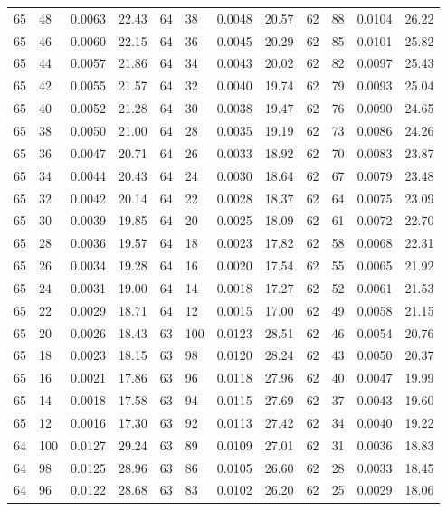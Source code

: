 \begin{tabular}{llll|llll|llll}
65 & 48 & 0.0063 & 22.43 & 64 & 38 & 0.0048 & 20.57 & 62 & 88 & 0.0104 & 26.22\\
65 & 46 & 0.0060 & 22.15 & 64 & 36 & 0.0045 & 20.29 & 62 & 85 & 0.0101 & 25.82\\
65 & 44 & 0.0057 & 21.86 & 64 & 34 & 0.0043 & 20.02 & 62 & 82 & 0.0097 & 25.43\\
65 & 42 & 0.0055 & 21.57 & 64 & 32 & 0.0040 & 19.74 & 62 & 79 & 0.0093 & 25.04\\
65 & 40 & 0.0052 & 21.28 & 64 & 30 & 0.0038 & 19.47 & 62 & 76 & 0.0090 & 24.65\\
65 & 38 & 0.0050 & 21.00 & 64 & 28 & 0.0035 & 19.19 & 62 & 73 & 0.0086 & 24.26\\
65 & 36 & 0.0047 & 20.71 & 64 & 26 & 0.0033 & 18.92 & 62 & 70 & 0.0083 & 23.87\\
65 & 34 & 0.0044 & 20.43 & 64 & 24 & 0.0030 & 18.64 & 62 & 67 & 0.0079 & 23.48\\
65 & 32 & 0.0042 & 20.14 & 64 & 22 & 0.0028 & 18.37 & 62 & 64 & 0.0075 & 23.09\\
65 & 30 & 0.0039 & 19.85 & 64 & 20 & 0.0025 & 18.09 & 62 & 61 & 0.0072 & 22.70\\
65 & 28 & 0.0036 & 19.57 & 64 & 18 & 0.0023 & 17.82 & 62 & 58 & 0.0068 & 22.31\\
65 & 26 & 0.0034 & 19.28 & 64 & 16 & 0.0020 & 17.54 & 62 & 55 & 0.0065 & 21.92\\
65 & 24 & 0.0031 & 19.00 & 64 & 14 & 0.0018 & 17.27 & 62 & 52 & 0.0061 & 21.53\\
65 & 22 & 0.0029 & 18.71 & 64 & 12 & 0.0015 & 17.00 & 62 & 49 & 0.0058 & 21.15\\
65 & 20 & 0.0026 & 18.43 & 63 & 100 & 0.0123 & 28.51 & 62 & 46 & 0.0054 & 20.76\\
65 & 18 & 0.0023 & 18.15 & 63 & 98 & 0.0120 & 28.24 & 62 & 43 & 0.0050 & 20.37\\
65 & 16 & 0.0021 & 17.86 & 63 & 96 & 0.0118 & 27.96 & 62 & 40 & 0.0047 & 19.99\\
65 & 14 & 0.0018 & 17.58 & 63 & 94 & 0.0115 & 27.69 & 62 & 37 & 0.0043 & 19.60\\
65 & 12 & 0.0016 & 17.30 & 63 & 92 & 0.0113 & 27.42 & 62 & 34 & 0.0040 & 19.22\\
64 & 100 & 0.0127 & 29.24 & 63 & 89 & 0.0109 & 27.01 & 62 & 31 & 0.0036 & 18.83\\
64 & 98 & 0.0125 & 28.96 & 63 & 86 & 0.0105 & 26.60 & 62 & 28 & 0.0033 & 18.45\\
64 & 96 & 0.0122 & 28.68 & 63 & 83 & 0.0102 & 26.20 & 62 & 25 & 0.0029 & 18.06\\

\end{tabular}
